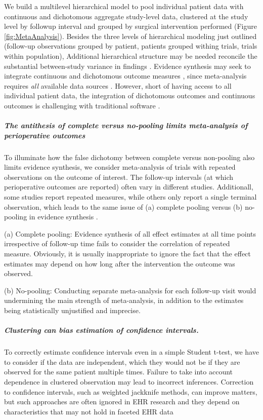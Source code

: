 \documentclass[11pt,notitlepage]{article}
\begin{document}
We build a multilevel hierarchical model to pool individual patient data with continuous and 
dichotomous aggregate study-level data, clustered at the study level by followup interval and grouped by surgical 
intervention performed (Figure \ref{fig:MetaAnalysis}). Besides the three levels of hierarchical modeling just outlined 
(follow-up observations grouped by patient, patients grouped withing trials, trials within population), 
Additional hierarchical structure may be needed reconcile the substantial between-study variance in findings \cite{Andreae2015}. 
Evidence synthesis may seek to integrate continuous and dichotomous outcome measures \cite{AndreaeJohnsonAbstract2013}, since
meta-analysis requires \textit{all} available data sources \cite{Deeks2011chapter}. However, short of having access to all individual patient data, 
the integration of dichotomous outcomes and continuous outcomes is challenging with traditional software
\cite{Andreae2015, Roth2015CriticalCare}. 

\subparagraph*{The antithesis of complete versus no-pooling limits meta-analysis of perioperative outcomes}
To illuminate how the false dichotomy between complete versus non-pooling also limits evidence 
synthesis, we consider meta-analysis of trials with repeated observations on the outcome of interest. 
The follow-up intervals (at which perioperative outcomes are reported) 
often vary in different studies. Additionall, some studies report repeated measures, while
others only report a single terminal observation, which leads to the same issue of (a) complete pooling 
versus (b) no-pooling in evidence synthesis 
\cite{Roth2015CriticalCare}.

(a) Complete pooling:
Evidence synthesis of all effect estimates at all time points irrespective of follow-up time 
fails to consider the correlation of repeated measure. Obviously, it is usually inappropriate 
to ignore the fact that the effect estimates may depend on how long after the intervention the outcome was observed.

(b) No-pooling: Conducting separate meta-analysis for each follow-up visit would undermining the main 
strength of meta-analysis, in addition to the estimates being statistically unjustified and imprecise.

\subparagraph*{Clustering can bias estimation of confidence intervals.} To 
correctly estimate confidence intervals even in a simple Student t-test, 
we have to consider if the data are independent, which they would not be if
they are observed for the same patient multiple times. Failure to take into 
account dependence in clustered observation may lead to incorrect inferences. 
Correction to confidence intervals, such as weighted jackknife methods, can 
improve matters, but such approaches are often ignored in EHR research 
and they depend on characteristics that may not hold in faceted EHR data
\end{document}
